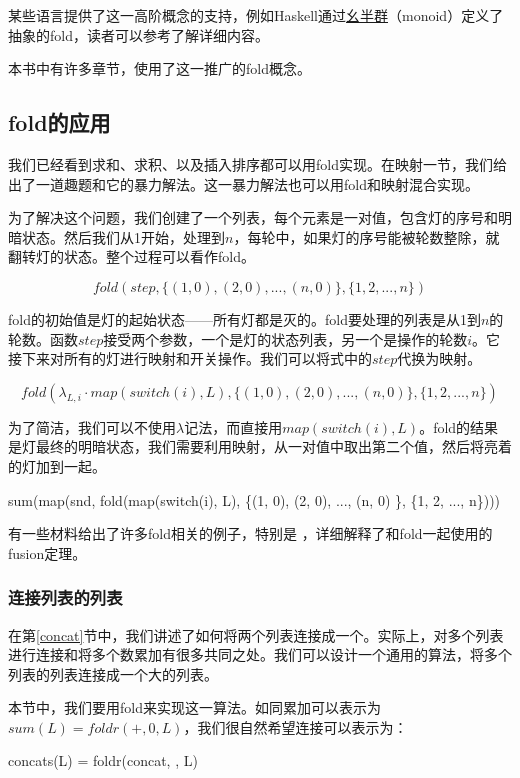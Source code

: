 \documentclass[UTF8]{article}
\begin{document}
某些语言提供了这一高阶概念的支持，例如Haskell通过\underline{幺半群}（monoid）定义了抽象的fold，读者可以参考\cite{learn-haskell}了解详细内容。

本书中有许多章节，使用了这一推广的fold概念。

\subsection{fold的应用}

我们已经看到求和、求积、以及插入排序都可以用fold实现。在映射一节，我们给出了一道趣题和它的暴力解法。这一暴力解法也可以用fold和映射混合实现。

为了解决这个问题，我们创建了一个列表，每个元素是一对值，包含灯的序号和明暗状态。然后我们从1开始，处理到$n$，每轮中，如果灯的序号能被轮数整除，就翻转灯的状态。整个过程可以看作fold。

\[
fold(step, \{(1, 0), (2, 0), ..., (n, 0) \}, \{1, 2, ..., n\})
\]

fold的初始值是灯的起始状态——所有灯都是灭的。fold要处理的列表是从1到$n$的轮数。函数$step$接受两个参数，一个是灯的状态列表，另一个是操作的轮数$i$。它接下来对所有的灯进行映射和开关操作。我们可以将式中的$step$代换为映射。

\[
fold(\lambda_{L, i} \cdot map(switch(i), L), \{(1, 0), (2, 0), ..., (n, 0) \}, \{1, 2, ..., n\})
\]

为了简洁，我们可以不使用$\lambda$记法，而直接用$map(switch(i), L)$。fold的结果是灯最终的明暗状态，我们需要利用映射，从一对值中取出第二个值，然后将亮着的灯加到一起。

\be
sum(map(snd, fold(map(switch(i), L), \{(1, 0), (2, 0), ..., (n, 0) \}, \{1, 2, ..., n\})))
\ee

有一些材料给出了许多fold相关的例子，特别是 \cite{fp-pearls}，详细解释了和fold一起使用的fusion定理。

\subsubsection{连接列表的列表}

在第\ref{concat}节中，我们讲述了如何将两个列表连接成一个。实际上，对多个列表进行连接和将多个数累加有很多共同之处。我们可以设计一个通用的算法，将多个列表的列表连接成一个大的列表。

本节中，我们要用fold来实现这一算法。如同累加可以表示为$sum(L) = foldr(+, 0, L)$，我们很自然希望连接可以表示为：

\be
concats(L) = foldr(concat, \phi, L)
\ee
\end{document}
